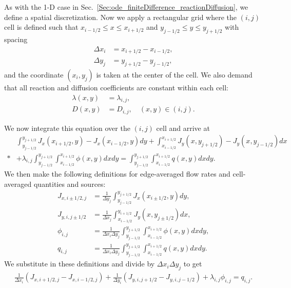 As with the 1-D case in Sec.~\ref{Sec:ode_finiteDifference_reactionDiffusion}, we define a spatial discretization. Now we apply a rectangular grid where the $(i,j)$ cell is defined such that $x_{i-1/2} \le x \le x_{i+1/2}$ and $y_{j-1/2} \le y \le y_{j+1/2}$ with spacing
\begin{subequations}
\begin{align}
  \Delta x_i &= x_{i+1/2} - x_{i-1/2}, \\
  \Delta y_j &= y_{j+1/2} - y_{j-1/2},
\end{align}
\end{subequations}
and the coordinate $(x_i,y_j)$ is taken at the center of the cell. We also demand that all reaction and diffusion coefficients are constant within each cell:
\begin{subequations}
\begin{align}
  \lambda(x,y) &= \lambda_{i,j} ,  \\
  D(x,y) &= D_{i,j},  \quad (x,y) \in (i,j).
\end{align}
\end{subequations}

We now integrate this equation over the $(i,j)$ cell and arrive at
\begin{align}
    &\int_{y_{j-1/2}}^{y_{j+1/2}} J_x(x_{i+1/2},y) - J_x(x_{i-1/2},y) dy
  +  \int_{x_{i-1/2}}^{x_{i+1/2}} J_y(x,y_{j+1/2}) - J_y(x,y_{j-1/2}) dx \nonumber \\*
  &+ \lambda_{i,j} \int_{y_{j-1/2}}^{y_{j+1/2}} \int_{x_{i-1/2}}^{x_{i+1/2}}  \phi(x,y) dx dy
  = \int_{y_{j-1/2}}^{y_{j+1/2}} \int_{x_{i-1/2}}^{x_{i+1/2}} q(x,y) dx dy .
\end{align}
We then make the following definitions for edge-averaged flow rates and cell-averaged quantities and sources:
\begin{subequations}
\begin{align}
  J_{x,{i \pm 1/2},j} &= \frac{1}{\Delta y_j} \int_{y_{j-1/2}}^{y_{j+1/2}} J_x(x_{i \pm 1/2},y) dy , \\
  J_{y,i,{j \pm 1/2}} &= \frac{1}{\Delta x_j} \int_{x_{i-1/2}}^{y_{i+1/2}} J_y(x,y_{j \pm 1/2}) dx , \\ 
  \phi_{i,j} &= \frac{1}{ \Delta x_i \Delta y_j } \int_{y_{j-1/2}}^{y_{j+1/2}} \int_{x_{i-1/2}}^{x_{i+1/2}}  \phi(x,y) dx dy , \\
  q_{i,j} &= \frac{1}{ \Delta x_i \Delta y_j } \int_{y_{j-1/2}}^{y_{j+1/2}} \int_{x_{i-1/2}}^{x_{i+1/2}}  q(x,y) dx dy .
\end{align}
\end{subequations}
We substitute in these definitions and divide by $\Delta x_i \Delta y_j$ to get
\begin{align}
    \frac{1}{\Delta x_i} \left( J_{x,{i + 1/2},j} - J_{x,{i - 1/2},j} \right)
  + \frac{1}{\Delta y_i} \left( J_{y,i,{j + 1/2}} - J_{y,i,{j - 1/2}} \right)
  + \lambda_{i,j} \phi_{i,j} = q_{i,j} .
\end{align} 

